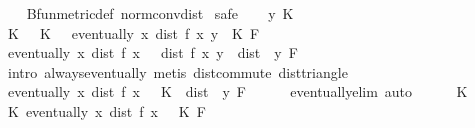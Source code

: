 \begin{isabellebody}
%
\isadelimproof
\ \ %
\endisadelimproof
%
\isatagproof
{}\isamarkupfalse%
\ Bfun{\isacharunderscore}{\kern0pt}metric{\isacharunderscore}{\kern0pt}def\ norm{\isacharunderscore}{\kern0pt}conv{\isacharunderscore}{\kern0pt}dist\isanewline
{}\isamarkupfalse%
\ safe\isanewline
\ \ \isamarkupfalse%
\ y\ K\isanewline
\ \ \isamarkupfalse%
\ K{\isacharcolon}{\kern0pt}\ {\isachardoublequoteopen}{}\ {\isacharless}{\kern0pt}\ K{\isachardoublequoteclose}\ \ {\isacharasterisk}{\kern0pt}{\isacharcolon}{\kern0pt}\ {\isachardoublequoteopen}eventually\ {\isacharparenleft}{\kern0pt}{\isasymlambda}x{\isachardot}{\kern0pt}\ dist\ {\isacharparenleft}{\kern0pt}f\ x{\isacharparenright}{\kern0pt}\ y\ {\isasymle}\ K{\isacharparenright}{\kern0pt}\ F{\isachardoublequoteclose}\isanewline
\ \ \isamarkupfalse%
\ \isamarkupfalse%
\ {\isachardoublequoteopen}eventually\ {\isacharparenleft}{\kern0pt}{\isasymlambda}x{\isachardot}{\kern0pt}\ dist\ {\isacharparenleft}{\kern0pt}f\ x{\isacharparenright}{\kern0pt}\ {}\ {\isasymle}\ dist\ {\isacharparenleft}{\kern0pt}f\ x{\isacharparenright}{\kern0pt}\ y\ {\isacharplus}{\kern0pt}\ dist\ {}\ y{\isacharparenright}{\kern0pt}\ F{\isachardoublequoteclose}\isanewline
\ \ \ \ \isamarkupfalse%
\ {\isacharparenleft}{\kern0pt}intro\ always{\isacharunderscore}{\kern0pt}eventually{\isacharparenright}{\kern0pt}\ {\isacharparenleft}{\kern0pt}metis\ dist{\isacharunderscore}{\kern0pt}commute\ dist{\isacharunderscore}{\kern0pt}triangle{\isacharparenright}{\kern0pt}\isanewline
\ \ \isamarkupfalse%
\ {\isacharasterisk}{\kern0pt}\ \isamarkupfalse%
\ {\isachardoublequoteopen}eventually\ {\isacharparenleft}{\kern0pt}{\isasymlambda}x{\isachardot}{\kern0pt}\ dist\ {\isacharparenleft}{\kern0pt}f\ x{\isacharparenright}{\kern0pt}\ {}\ {\isasymle}\ K\ {\isacharplus}{\kern0pt}\ dist\ {}\ y{\isacharparenright}{\kern0pt}\ F{\isachardoublequoteclose}\isanewline
\ \ \ \ \isamarkupfalse%
\ eventually{\isacharunderscore}{\kern0pt}elim\ auto\isanewline
\ \ \isamarkupfalse%
\ {\isacartoucheopen}{}\ {\isacharless}{\kern0pt}\ K{\isacartoucheclose}\ \isamarkupfalse%
\ {\isachardoublequoteopen}{\isasymexists}K{\isachargreater}{\kern0pt}{}{\isachardot}{\kern0pt}\ eventually\ {\isacharparenleft}{\kern0pt}{\isasymlambda}x{\isachardot}{\kern0pt}\ dist\ {\isacharparenleft}{\kern0pt}f\ x{\isacharparenright}{\kern0pt}\ {}\ {\isasymle}\ K{\isacharparenright}{\kern0pt}\ F{\isachardoublequoteclose}\isanewline

\end{isabellebody}
